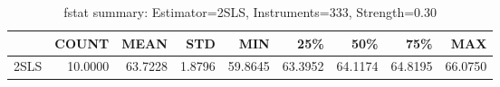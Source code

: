 \begin{table}[ht]
\centering
\caption{fstat summary: Estimator=2SLS, Instruments=333, Strength=0.30}
\begin{tabular}{lrrrrrrrr}
\toprule
 & COUNT & MEAN & STD & MIN & 25\% & 50\% & 75\% & MAX \\
\midrule
2SLS & 10.0000 & 63.7228 & 1.8796 & 59.8645 & 63.3952 & 64.1174 & 64.8195 & 66.0750 \\
\bottomrule
\end{tabular}
\end{table}
